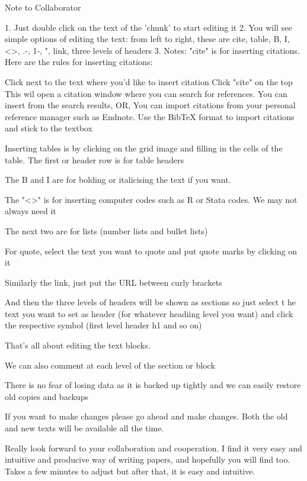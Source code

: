 Note to Collaborator

1. Just double click on the text of the 'chunk' to start editing it
2. You will see simple options of editing the text: from left to right, these are cite, table, B, I, <>, .-, 1-, ", link, three levels of headers
3. Notes: "cite" is for inserting citations. Here are the rules for inserting citations:

Click next to the text where you'd like to insert citation
Click "cite" on the top
This wil open a citation window where you can search for references. You can insert from the search results, OR,
You can import citations from your personal reference manager such as  Endnote. Use the BibTeX format to import citations and stick to the textbox

Inserting tables is by clicking on the grid image and  filling in the cells of the table. The first or header row is for table headers

The  B and I are for bolding or italicising the text if you want. 

The "<>" is for inserting computer codes such as R or Stata codes. We may not always need it

The next two are for lists (number lists and bullet lists)

For quote, select the text you want to  quote and put quote marks by clicking on it

Similarly the link, just put the URL between curly brackets 

And then the three levels of headers will be shown as sections so just select t he text you want to set as header (for whatever headiing level you want) and click the respective symbol (first level header h1 and so on)

That's all about editing the text blocks.

We can also comment at each  level of the section or block

There is no fear of losing data as it is backed up tightly and we can easily restore  old copies and backups

If you want to make changes  please go ahead and make changes.  Both the old and new texts will be available all the time.

Really look forward to your collaboration and cooperation. I find it very easy and intuitive and producive way of writing papers, and hopefully  you will find too. Takes a few minutes to adjust but after that, it is easy and intuitive. 


